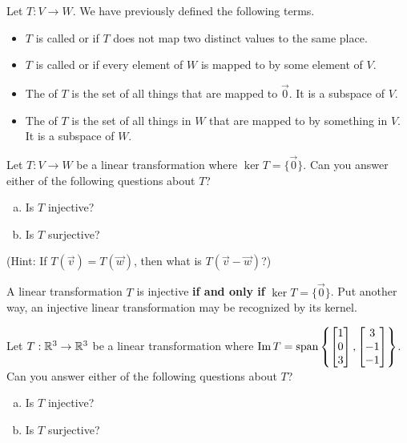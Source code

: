 
\begin{applicationActivities}{3}{19}

\begin{observation}
Let $T: V \rightarrow W$.  We have previously defined the following
terms.
\begin{itemize}
\item  $T$ is called  or  if $T$ does not map two distinct values to the same place.
\item $T$ is called  or  if every element of $W$ is mapped to by some element of $V$.
\item The  of $T$ is the set of all things that are mapped to $\vec{0}$.  It is a subspace of $V$.
\item The  of $T$ is the set of all things in $W$ that are mapped to by something in $V$.  It is a subspace of $W$.
\end{itemize}
\end{observation}

\begin{activity}{5}
Let $T: V \rightarrow W$ be a linear transformation where
$\ker T = \{ \vec{0} \}$. Can you answer either of the following questions
about \(T\)?
\begin{enumerate}[(a)]
\item Is $T$ injective?
\item Is $T$ surjective?
\end{enumerate}
(Hint: If $T(\vec{v})=T(\vec{w})$, then what is $T(\vec{v}-\vec{w})$?)
\end{activity}

\begin{fact}
A linear transformation $T$ is injective \textbf{if and only if} $\ker T = \{\vec{0}\}$. Put another way, an injective linear transformation may be
recognized by its  kernel.
\end{fact}

\begin{activity}{5}
Let $T: \mathbb{R}^3 \rightarrow \mathbb{R}^3$ be a linear transformation where
$\operatorname{Im} T = \operatorname{span} \left\{ \begin{bmatrix} 1 \\ 0 \\ 3 \end{bmatrix}, \begin{bmatrix} 3 \\ -1 \\ -1 \end{bmatrix} \right\}$.
Can you answer either of the following questions about \(T\)?
\begin{enumerate}[(a)]
\item Is $T$ injective?
\item Is $T$ surjective?
\end{enumerate}
\end{activity}


\end{applicationActivities}
